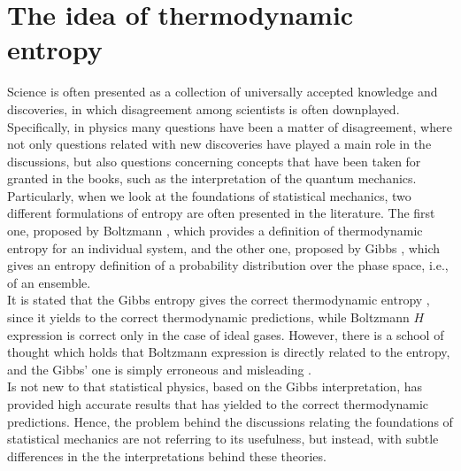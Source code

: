 \section{The idea of thermodynamic entropy}
Science is often presented as a collection of universally accepted knowledge and discoveries, in which disagreement among scientists is often downplayed.
Specifically, in physics many questions have been a matter of disagreement, where not only questions related with new discoveries have played a main role in the discussions, but also questions concerning concepts that have been taken for granted in the books, such as the interpretation of the quantum mechanics. Particularly, when we look at the foundations of statistical mechanics, two different formulations of entropy are often presented in the literature. The first one, proposed by Boltzmann \cite{boltzmann1871prioritat}, which provides a definition of thermodynamic entropy for an individual system, and the other one, proposed by Gibbs \cite{gibbs_elementary_1902}, which gives an entropy definition of a probability distribution over the phase space, i.e., of an ensemble.\\

\indent It is stated that the Gibbs entropy gives the correct thermodynamic entropy \cite{lr_statistical_1963}, since it yields to the correct thermodynamic predictions, while Boltzmann $H$ expression is correct only in the case of ideal gases. However, there is a school of thought which holds that Boltzmann expression is directly related to the entropy, and the Gibbs' one is simply erroneous and misleading \cite{ehrenfest_conceptual_1959}.\\
\indent Is not new to that statistical physics, based on the Gibbs interpretation, has provided high accurate results that has yielded to the correct thermodynamic predictions. Hence, the problem behind the discussions relating the foundations of statistical mechanics are not referring to its usefulness, but instead, with subtle differences in the the interpretations behind these theories.
